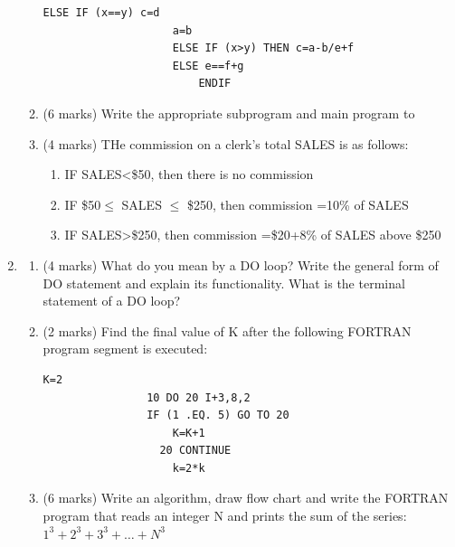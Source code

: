 \documentclass[12pt,oneside]{book}
\begin{document}
\begin{enumerate}
\begin{enumerate}
\begin{lstlisting}[numbers=none]
                    ELSE IF (x==y) c=d
                    a=b
                    ELSE IF (x>y) THEN c=a-b/e+f
                    ELSE e==f+g
                        ENDIF
            \end{lstlisting}
            \item (6 marks) Write the appropriate subprogram and main program to\\
            \item (4 marks) THe commission on a clerk's total SALES is as follows:
            \begin{enumerate}
                \item IF SALES<\$50, then there is no commission
                \item IF \$50$ \leq $ SALES $ \leq $ \$250, then commission =10\% of SALES
                \item IF SALES>\$250, then commission =\$20+8\% of SALES above \$250
            \end{enumerate}
        \end{enumerate}
        \item \begin{enumerate}
            \item (4 marks) What do you mean by a DO loop? Write the general form of DO statement and explain its functionality. What is the terminal statement of a DO loop?
            \item (2 marks) Find the final value of K after the following FORTRAN program segment is executed:
            \begin{lstlisting}[numbers=none]
                    K=2
                10 DO 20 I+3,8,2
                IF (1 .EQ. 5) GO TO 20
                    K=K+1
                  20 CONTINUE
                    k=2*k
            \end{lstlisting}
            \item (6 marks) Write an algorithm, draw flow chart and write the FORTRAN program that reads an integer N and prints the sum of the series: $ 1^3+2^3+3^3+\dots+N^3 $
        \end{enumerate}

\end{enumerate}
\end{document}
